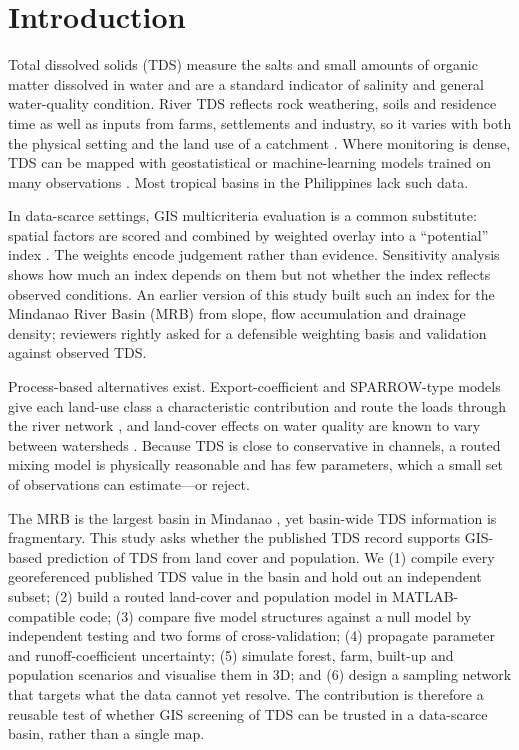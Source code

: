 \documentclass[10pt,twocolumn,letterpaper]{article}
\begin{document}
\section{Introduction}
Total dissolved solids (TDS) measure the salts and small amounts of organic matter dissolved in water and are a standard indicator of salinity and general water-quality condition. River TDS reflects rock weathering, soils and residence time as well as inputs from farms, settlements and industry, so it varies with both the physical setting and the land use of a catchment \cite{asnake,merriam}. Where monitoring is dense, TDS can be mapped with geostatistical or machine-learning models trained on many observations \cite{stephens,aju}. Most tropical basins in the Philippines lack such data.

In data-scarce settings, GIS multicriteria evaluation is a common substitute: spatial factors are scored and combined by weighted overlay into a ``potential'' index \cite{malcz}. The weights encode judgement rather than evidence. Sensitivity analysis shows how much an index depends on them \cite{chen,ligmann} but not whether the index reflects observed conditions. An earlier version of this study built such an index for the Mindanao River Basin (MRB) from slope, flow accumulation and drainage density; reviewers rightly asked for a defensible weighting basis and validation against observed TDS.

Process-based alternatives exist. Export-coefficient and SPARROW-type models give each land-use class a characteristic contribution and route the loads through the river network \cite{johnes,sparrow}, and land-cover effects on water quality are known to vary between watersheds \cite{tu}. Because TDS is close to conservative in channels, a routed mixing model is physically reasonable and has few parameters, which a small set of observations can estimate---or reject.

The MRB is the largest basin in Mindanao \cite{guiamel}, yet basin-wide TDS information is fragmentary. This study asks whether the published TDS record supports GIS-based prediction of TDS from land cover and population. We (1) compile every georeferenced published TDS value in the basin and hold out an independent subset; (2) build a routed land-cover and population model in MATLAB-compatible code; (3) compare five model structures against a null model by independent testing and two forms of cross-validation; (4) propagate parameter and runoff-coefficient uncertainty; (5) simulate forest, farm, built-up and population scenarios and visualise them in 3D; and (6) design a sampling network that targets what the data cannot yet resolve. The contribution is therefore a reusable test of whether GIS screening of TDS can be trusted in a data-scarce basin, rather than a single map.
\end{document}
